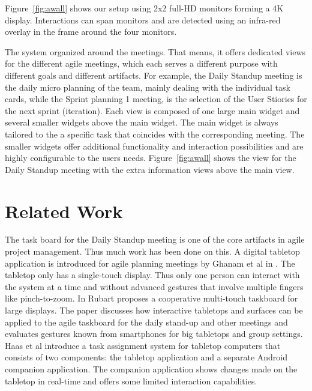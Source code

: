 \documentclass{sigchi}
\begin{document}
Figure~\ref{fig:awall} shows our setup using 2x2 full-HD monitors forming a 4K display.
Interactions can span monitors and are detected using an infra-red overlay in the frame around the four monitors.

The system organized around the meetings. That means, it offers dedicated views for the different agile meetings, which each serves a different purpose with different goals and different artifacts. For example, the Daily Standup meeting is the daily micro planning of the team, mainly dealing with the individual task cards, while the Sprint planning 1 meeting, is the selection of the User Stiories for the next sprint (iteration).
Each view is composed of one large main widget and several smaller widgets above the main widget.
The main widget is always tailored to the a specific task that coincides with the corresponding meeting.
The smaller widgets offer additional functionality and interaction possibilities and are highly configurable to the users needs.
Figure~\ref{fig:awall} shows the view for the Daily Standup meeting with the extra information views above the main view.


\section{Related Work}
The task board for the Daily Standup meeting is one of the core artifacts in agile project management. Thus much  work has been done on this. 
A digital tabletop application is introduced for agile planning meetings by Ghanam et al in \cite{Ghanam:4599452}. 
The tabletop only has a single-touch display. 
Thus only one person can interact with the system at a time and without advanced gestures that involve multiple fingers like pinch-to-zoom.
In \cite{Rubart:2014:CMS:2669485.2669551} Rubart proposes a cooperative multi-touch taskboard for large displays.
The paper discusses how interactive tabletops and surfaces can be applied to the agile taskboard for the daily stand-up and other meetings and evaluates gestures known from smartphones for big tabletops and group settings.
Haas et al \cite{Haas:2014:TAV:2669485.2669538} introduce a task assignment system for tabletop computers that consists of two components: the tabletop application and a separate Android companion application.
The companion application shows changes made on the tabletop in real-time and offers some limited interaction capabilities.
\end{document}
